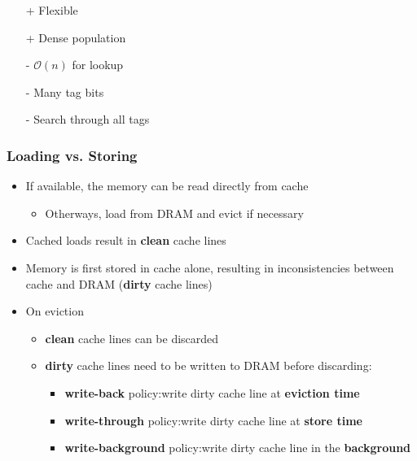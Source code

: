 \newpar{}
\begin{itemize}
    \item[+] Flexible
    \item[+] Dense population
    \item[-] $\mathcal{O}(n)$ for lookup
    \item[-] Many tag bits
    \item[-] Search through all tags
\end{itemize}

\subsubsection{Loading vs. Storing}
\begin{itemize}
    \item If available, the memory can be read directly from cache
    \begin{itemize}
        \item Otherways, load from DRAM and evict if necessary
    \end{itemize}
    \item Cached loads result in \textbf{clean} cache lines
\end{itemize}

\newpar{}
\begin{itemize}
    \item Memory is first stored in cache alone, resulting in inconsistencies between cache and DRAM (\textbf{dirty} cache lines)
    \item On eviction
          \begin{itemize}
              \item \textbf{clean} cache lines can be discarded
              \item \textbf{dirty} cache lines need to be written to DRAM before discarding:
                    \begin{itemize}
                        \item \textbf{write-back} policy:\newline write dirty cache line at \textbf{eviction time}
                        \item \textbf{write-through} policy:\newline write dirty cache line at \textbf{store time}
                        \item \textbf{write-background} policy:\newline write dirty cache line in the \textbf{background}
                    \end{itemize}
          \end{itemize}
\end{itemize}